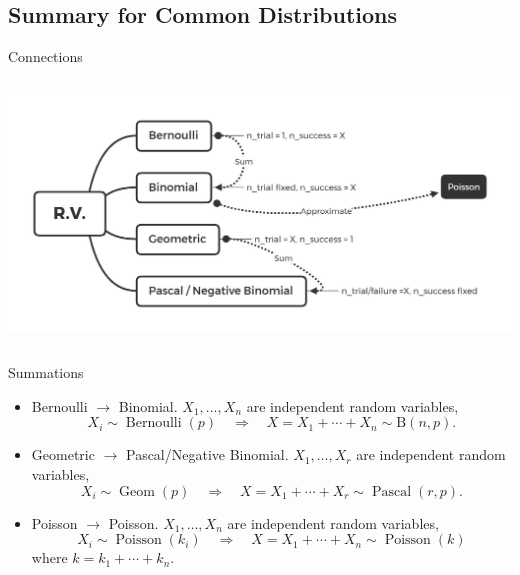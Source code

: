 \documentclass{beamer}
\begin{document}
\subsection{Summary for Common Distributions}
\begin{frame}{Connections}
\begin{columns}
\column{\dimexpr\paperwidth-30pt}
\includegraphics[scale=0.22]{Discrete.jpg}
\end{columns}
\end{frame}

\begin{frame}{Summations}
\begin{itemize}
\item Bernoulli $\rightarrow$ Binomial. $X_{1}, \ldots, X_{n}$ are independent random variables,
$$
X_{i} \sim \operatorname{Bernoulli}(p) \quad \Rightarrow \quad X=X_{1}+\cdots+X_{n} \sim \mathrm{B}(n, p) .
$$
\item Geometric $\rightarrow$ Pascal/Negative Binomial. $X_{1}, \ldots, X_{r}$ are independent random variables,
$$
X_{i} \sim \operatorname{Geom}(p) \quad \Rightarrow \quad X=X_{1}+\cdots+X_{r} \sim \operatorname{Pascal}(r, p) .
$$
\item Poisson $\rightarrow$ Poisson. $X_{1}, \ldots, X_{n}$ are independent random variables,
$$
X_{i} \sim \operatorname{Poisson}\left(k_{i}\right) \quad \Rightarrow \quad X=X_{1}+\cdots+X_{n} \sim \operatorname{Poisson}(k)
$$
where $k=k_{1}+\cdots+k_{n}$.
\end{itemize}
\end{frame}
\end{document}
